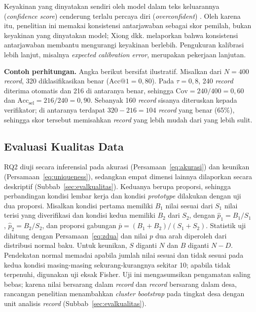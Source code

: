 \noindent Keyakinan yang dinyatakan sendiri oleh model dalam teks keluarannya (\textit{confidence score}) cenderung terlalu percaya diri (\textit{overconfident}) \cite{xiong2024calibration}. Oleh karena itu, penelitian ini memakai konsistensi antarjawaban sebagai skor pemilah, bukan keyakinan yang dinyatakan model; Xiong dkk. melaporkan bahwa konsistensi antarjawaban membantu mengurangi keyakinan berlebih. Pengukuran kalibrasi lebih lanjut, misalnya \textit{expected calibration error}, merupakan pekerjaan lanjutan.

\noindent\textbf{Contoh perhitungan.} Angka berikut bersifat ilustratif. Misalkan dari $N = 400$ \textit{record}, 320 diklasifikasikan benar ($\text{Acc@}1 = 0{,}80$). Pada $\tau = 0{,}8$, 240 \textit{record} diterima otomatis dan 216 di antaranya benar, sehingga $\text{Cov} = 240/400 = 0{,}60$ dan $\text{Acc}_{\text{sel}} = 216/240 = 0{,}90$. Sebanyak 160 \textit{record} sisanya diteruskan kepada verifikator; di antaranya terdapat $320 - 216 = 104$ \textit{record} yang benar (65\%), sehingga skor tersebut memisahkan \textit{record} yang lebih mudah dari yang lebih sulit.

\subsection{Evaluasi Kualitas Data}
\label{sec:evaluasi-kualitas}

RQ2 diuji secara inferensial pada akurasi (Persamaan~\eqref{eq:akurasi}) dan keunikan (Persamaan~\eqref{eq:uniqueness}), sedangkan empat dimensi lainnya dilaporkan secara deskriptif (Subbab~\ref{sec:evalkualitas}). Keduanya berupa proporsi, sehingga perbandingan kondisi lembar kerja dan kondisi \textit{prototype} dilakukan dengan uji dua proporsi. Misalkan kondisi pertama memiliki $B_1$ nilai sesuai dari $S_1$ nilai terisi yang diverifikasi dan kondisi kedua memiliki $B_2$ dari $S_2$, dengan $\hat{p}_1 = B_1/S_1$, $\hat{p}_2 = B_2/S_2$, dan proporsi gabungan $\bar{p} = (B_1 + B_2)/(S_1 + S_2)$. Statistik uji dihitung dengan Persamaan~\eqref{eq:zdua} dan nilai $p$ dua arah diperoleh dari distribusi normal baku. Untuk keunikan, $S$ diganti $N$ dan $B$ diganti $N - D$. Pendekatan normal memadai apabila jumlah nilai sesuai dan tidak sesuai pada kedua kondisi masing-masing sekurang-kurangnya sekitar 10; apabila tidak terpenuhi, digunakan uji eksak Fisher. Uji ini mengasumsikan pengamatan saling bebas; karena nilai bersarang dalam \textit{record} dan \textit{record} bersarang dalam desa, rancangan penelitian menambahkan \textit{cluster bootstrap} pada tingkat desa dengan unit analisis \textit{record} (Subbab~\ref{sec:evalkualitas}).

